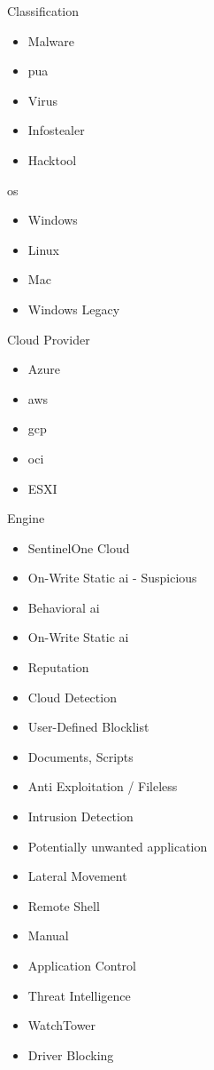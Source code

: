 \begin{multicols}{2}
      Classification
      \begin{itemize}
            \item Malware
            \item \acrshort{pua}
            \item Virus
            \item Infostealer
            \item Hacktool
      \end{itemize}

      \acrshort{os}
      \begin{itemize}
            \item Windows
            \item Linux
            \item Mac
            \item Windows Legacy
      \end{itemize}

      Cloud Provider
      \begin{itemize}
            \item Azure
            \item \acrshort{aws}
            \item \acrshort{gcp}
            \item \acrshort{oci}
            \item ESXI
      \end{itemize}

      Engine
      \begin{itemize}
            \item SentinelOne Cloud
            \item On-Write Static \acrshort{ai} - Suspicious
            \item Behavioral \acrshort{ai}
            \item On-Write Static \acrshort{ai}
            \item Reputation
            \item Cloud Detection
            \item User-Defined Blocklist
            \item Documents, Scripts
            \item Anti Exploitation / Fileless
            \item Intrusion Detection
            \item Potentially unwanted application
            \item Lateral Movement
            \item Remote Shell
            \item Manual
            \item Application Control
            \item Threat Intelligence
            \item WatchTower
            \item Driver Blocking
      \end{itemize}


\end{multicols}
